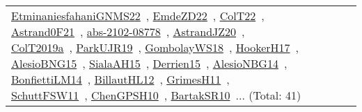 {\begin{longtable}{lp{3cm}>{\raggedright\arraybackslash}p{6cm}>{\raggedright\arraybackslash}p{6cm}>{\raggedright\arraybackslash}p{8cm}}
\href{../works/EtminaniesfahaniGNMS22.pdf}{EtminaniesfahaniGNMS22}~\cite{EtminaniesfahaniGNMS22}, \href{../works/EmdeZD22.pdf}{EmdeZD22}~\cite{EmdeZD22}, \href{../works/ColT22.pdf}{ColT22}~\cite{ColT22}, \href{../works/Astrand0F21.pdf}{Astrand0F21}~\cite{Astrand0F21}, \href{../works/abs-2102-08778.pdf}{abs-2102-08778}~\cite{abs-2102-08778}, \href{../works/AstrandJZ20.pdf}{AstrandJZ20}~\cite{AstrandJZ20}, \href{../works/ColT2019a.pdf}{ColT2019a}~\cite{ColT2019a}, \href{../works/ParkUJR19.pdf}{ParkUJR19}~\cite{ParkUJR19}, \href{../works/GombolayWS18.pdf}{GombolayWS18}~\cite{GombolayWS18}, \href{../works/HookerH17.pdf}{HookerH17}~\cite{HookerH17}, \href{../works/AlesioBNG15.pdf}{AlesioBNG15}~\cite{AlesioBNG15}, \href{../works/SialaAH15.pdf}{SialaAH15}~\cite{SialaAH15}, \href{../works/Derrien15.pdf}{Derrien15}~\cite{Derrien15}, \href{../works/AlesioNBG14.pdf}{AlesioNBG14}~\cite{AlesioNBG14}, \href{../works/BonfiettiLM14.pdf}{BonfiettiLM14}~\cite{BonfiettiLM14}, \href{../works/BillautHL12.pdf}{BillautHL12}~\cite{BillautHL12}, \href{../works/GrimesH11.pdf}{GrimesH11}~\cite{GrimesH11}, \href{../works/SchuttFSW11.pdf}{SchuttFSW11}~\cite{SchuttFSW11}, \href{../works/ChenGPSH10.pdf}{ChenGPSH10}~\cite{ChenGPSH10}, \href{../works/BartakSR10.pdf}{BartakSR10}~\cite{BartakSR10}... (Total: 41)\\

\end{longtable}}
